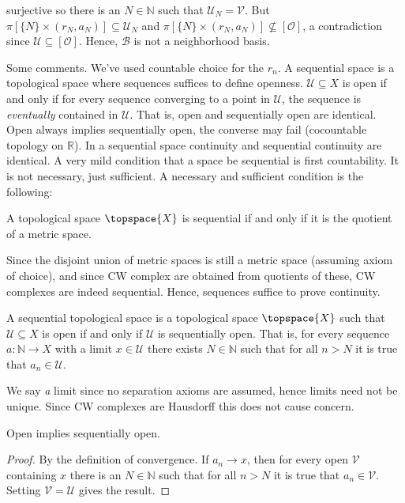 \documentclass{article}                                                        %
\begin{document}
    surjective so there is an $N\in\mathbb{N}$ such that
    $\mathcal{U}_{N}=\mathcal{V}$. But
    $\pi[\{N\}\times(r_{N},a_{N})]\subseteq\mathcal{U}_{N}$ and
    $\pi[\{N\}\times(r_{N},a_{N})]\nsubseteq[\mathcal{O}]$, a contradiction
    since $\mathcal{U}\subseteq[\mathcal{O}]$. Hence, $\mathcal{B}$ is not a
    neighborhood basis.
    \par\hfill\par
    Some comments. We've used countable choice for the $r_{n}$. A sequential
    space is a topological space where sequences suffices to define openness.
    $\mathcal{U}\subseteq{X}$ is open if and only if for every sequence
    converging to a point in $\mathcal{U}$, the sequence is \textit{eventually}
    contained in $\mathcal{U}$. That is, open and sequentially open are
    identical. Open always implies sequentially open, the
    converse may fail (cocountable topology on $\mathbb{R}$). In a sequential
    space continuity and sequential continuity are identical. A very mild
    condition that a space be sequential
    is first countability. It is not necessary, just sufficient. A necessary and
    sufficient condition is the following:
    \begin{theorem}
        A topological space $\topspace{X}$ is sequential if and only if it is
        the quotient of a metric space.
    \end{theorem}
    Since the disjoint union of metric spaces is still a metric space (assuming
    axiom of choice), and since CW complex are obtained from quotients of
    these, CW complexes are indeed sequential. Hence, sequences suffice to prove
    continuity.
    \begin{definition}
        A sequential topological space is a topological space $\topspace{X}$
        such that $\mathcal{U}\subseteq{X}$ is open if and only if $\mathcal{U}$
        is sequentially open. That is, for every sequence
        $a:\mathbb{N}\rightarrow{X}$ with a limit $x\in\mathcal{U}$ there exists
        $N\in\mathbb{N}$ such that for all $n>N$ it is true that
        $a_{n}\in\mathcal{U}$.
    \end{definition}
    We say \textit{a} limit since no separation axioms are assumed, hence limits
    need not be unique. Since CW complexes are Hausdorff this does not cause
    concern.
    \begin{theorem}
        Open implies sequentially open.
    \end{theorem}
    \begin{proof}
        By the definition of convergence. If $a_{n}\rightarrow{x}$, then for
        every open $\mathcal{V}$ containing $x$ there is an $N\in\mathbb{N}$
        such that for all $n>N$ it is true that $a_{n}\in\mathcal{V}$. Setting
        $\mathcal{V}=\mathcal{U}$ gives the result.
    \end{proof}
\end{document}
